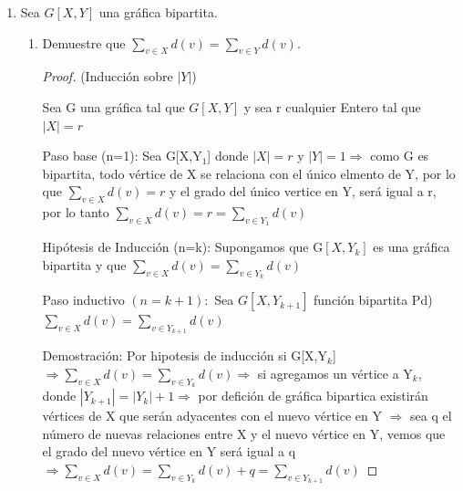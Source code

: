 \documentclass{article}
\begin{document}
\begin{enumerate}
\begin{enumerate}
\begin{proof}
      Ahora notemos que, en $Y$ están todos los subconjuntos de
      $BL_n$  que tienen cardinalidad impar. Por lo tanto, la
      diferencia simétrica en cualesquiera dos subconjuntos
      distintos en $Y$ es:
      \begin{itemize}
      \item[-] Al menos un conjunto de cardinalidad $2$.
      \end{itemize}
      Entonces tenemos que: $2k + 1 - (2k -1) = 2$ y como $Y$
      es un conjunto, no se tiene dos conjuntos iguales a los
      cuales relacionar. Por lo anterior y por la definición de
      diferencia simétrica, no existen dos conjuntos adyacentes
      en $Y$.
      
      \hspace*{3cm}  $\therefore$ \ \ \ $BL_n$ es bipartita en $X$ y $Y$, \textit{i.e.} $BL_n[X,Y]$
    \end{proof}
  \end{enumerate}
  
\item Sea $G[X, Y]$ una gr\'afica bipartita.
  \begin{enumerate}

  \item Demuestre que $\sum_{v \in X} d(v) = \sum_{v \in Y} d(v)$.
  \begin{proof}
    (Inducción sobre ${|Y|}$)
    
    Sea G una gráfica tal que $G[X,Y]$ y sea r cualquier Entero tal que $|X|=r$
    
    Paso base (n=1): Sea G[X,Y$_1$] donde $|X|=r$ y $|Y|=1 \Longrightarrow $
    como G es bipartita, todo vértice de X se relaciona con el único elmento
    de Y, por lo que $\sum_{v \in X}d(v) = r $ y el grado del único vertice
    en Y, será igual a r, por lo tanto $\sum_{v \in X}d(v) = r = \sum_{v \in Y_1}d(v)$
    
    Hipótesis de Inducción (n=k): Supongamos que G$[X, Y_k]$ es una gráfica
    bipartita y que $\sum_{v \in X}d(v) = \sum_{v \in Y_k}d(v) $ 
    
    Paso inductivo $(n=k+1):$ Sea $G[X,Y_{k+1}]$ función bipartita Pd)
    $\sum_{v \in X} d(v) = \sum_{v \in Y_{k+1}}d(v)$ 
    
    Demostración: Por hipotesis de inducción si  G[X,Y$_k$]
    $\Longrightarrow \sum_{v \in X}d(v) = \sum_{v \in Y_k}d(v) \Longrightarrow$
    si agregamos un vértice a Y$_k$, donde $|Y_{k+1}|= |Y_k| +1 \Longrightarrow$
    por defición de gráfica bipartica existirán vértices de X que serán adyacentes
    con el nuevo vértice en Y $\Longrightarrow$ sea q el número de nuevas relaciones
    entre X y el nuevo vértice en Y, vemos que el grado del nuevo vértice en Y será
    igual a q $\Longrightarrow \sum_{v \in X} d(v) = \sum_{v \in Y_k}d(v) + q =  \sum_{v \in Y_{k+1}}d(v) $ 
    

\end{proof}
\end{enumerate}
\end{enumerate}
\end{document}
